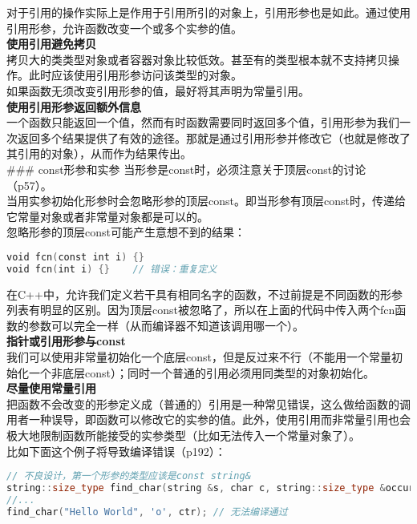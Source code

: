 \documentclass[
  a4paper,
  oneside,tablecaptionabove
]{scrbook}
\begin{document}
对于引用的操作实际上是作用于引用所引的对象上，引用形参也是如此。通过使用引用形参，允许函数改变一个或多个实参的值。\\
\textbf{使用引用避免拷贝}\\
拷贝大的类类型对象或者容器对象比较低效。甚至有的类型根本就不支持拷贝操作。此时应该使用引用形参访问该类型的对象。\\
如果函数无须改变引用形参的值，最好将其声明为常量引用。\\
\textbf{使用引用形参返回额外信息}\\
一个函数只能返回一个值，然而有时函数需要同时返回多个值，引用形参为我们一次返回多个结果提供了有效的途径。那就是通过引用形参并修改它（也就是修改了其引用的对象），从而作为结果传出。\\
\#\#\# const形参和实参
当形参是const时，必须注意关于顶层const的讨论（p57）。\\
当用实参初始化形参时会忽略形参的顶层const。即当形参有顶层const时，传递给它常量对象或者非常量对象都是可以的。\\
忽略形参的顶层const可能产生意想不到的结果：

\begin{lstlisting}[language={C++}]
void fcn(const int i) {}
void fcn(int i) {}    // 错误：重复定义
\end{lstlisting}

在C++中，允许我们定义若干具有相同名字的函数，不过前提是不同函数的形参列表有明显的区别。因为顶层const被忽略了，所以在上面的代码中传入两个fcn函数的参数可以完全一样（从而编译器不知道该调用哪一个）。\\
\textbf{指针或引用形参与const}\\
我们可以使用非常量初始化一个底层const，但是反过来不行（不能用一个常量初始化一个非底层const）；同时一个普通的引用必须用同类型的对象初始化。\\
\textbf{尽量使用常量引用}\\
把函数不会改变的形参定义成（普通的）引用是一种常见错误，这么做给函数的调用者一种误导，即函数可以修改它的实参的值。此外，使用引用而非常量引用也会极大地限制函数所能接受的实参类型（比如无法传入一个常量对象了）。\\
比如下面这个例子将导致编译错误（p192）：

\begin{lstlisting}[language={C++}]
// 不良设计，第一个形参的类型应该是const string&
string::size_type find_char(string &s, char c, string::size_type &occurs);
//...
find_char("Hello World", 'o', ctr); // 无法编译通过
\end{lstlisting}
\end{document}
